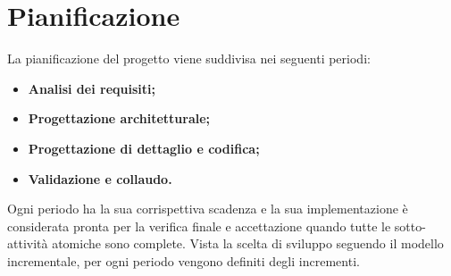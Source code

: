 \section{Pianificazione}
La pianificazione del progetto viene suddivisa nei seguenti periodi:
\begin{itemize}
	\item \textbf{Analisi dei requisiti;}
	\item \textbf{Progettazione architetturale;}
	\item \textbf{Progettazione di dettaglio e codifica;}
	\item \textbf{Validazione e collaudo.}
\end{itemize}
Ogni periodo ha la sua corrispettiva scadenza e la sua implementazione è considerata pronta per la verifica finale e accettazione quando tutte le sotto-attività atomiche sono complete. Vista la scelta di sviluppo seguendo il modello incrementale, per ogni periodo vengono definiti degli incrementi.

